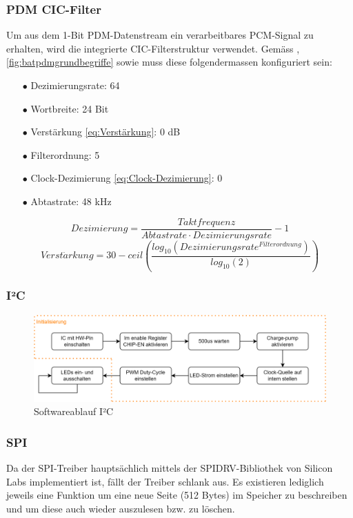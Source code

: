\documentclass[12pt]{article}
\begin{document}
	\subsubsection*{PDM CIC-Filter}
	Um aus dem 1-Bit PDM-Datenstream ein verarbeitbares PCM-Signal zu erhalten, wird die integrierte CIC-Filterstruktur verwendet. Gemäss \cite{silicon_efr32xg22_2022}, \ref{fig:batpdmgrundbegriffe} sowie \cite{noauthor_httpsinvensensetdkcomwp-contentuploads202007ds-000157-ics-41351-v14pdf_nodate} muss diese folgendermassen konfiguriert sein:
	\begin{itemize}[topsep=10pt,partopsep=0pt,labelwidth=5cm,align=left,itemindent=5cm]
	\item[$\bullet$ Dezimierungsrate:] 64
	\item[$\bullet$ Wortbreite:]  24 Bit
	\item[$\bullet$ Verstärkung \ref{eq:Verstärkung}:]  0 dB 
	\item[$\bullet$ Filterordnung:]  5
	\item[$\bullet$ Clock-Dezimierung \ref{eq:Clock-Dezimierung}:]  0 
	\item[$\bullet$ Abtastrate:]  48 kHz
	\end{itemize}
	\begin{equation}\label{eq:Clock-Dezimierung}
		Dezimierung = \frac{Taktfrequenz}{Abtastrate \cdot Dezimierungsrate} - 1
	\end{equation}
	\begin{equation}\label{eq:Verstärkung}
		Verst\ddot{a}rkung = 30 - ceil \left( \dfrac{log_{10}\left(Dezimierungsrate^{Filterordnung}\right)}{log_{10}(2)}\right)
	\end{equation}
	\subsubsection*{I²C}
	\begin{figure}[H]
		\centering
		\includegraphics[width=1\linewidth]{images/BAT_Flussdiagramm_I2C_V2}
		\caption{Softwareablauf I²C}
		\label{fig:batflussdiagrammi2cv2}
	\end{figure}
	\subsubsection*{SPI}
	Da der SPI-Treiber hauptsächlich mittels der SPIDRV-Bibliothek von Silicon Labs implementiert ist, fällt der Treiber schlank aus. Es existieren lediglich jeweils eine Funktion um eine neue Seite (512 Bytes) im Speicher zu beschreiben und um diese auch wieder auszulesen bzw. zu löschen.
\end{document}

